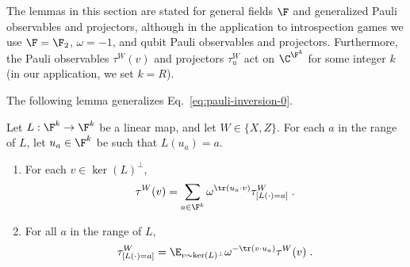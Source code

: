 The lemmas in this section are stated for general fields $\F$ and generalized
Pauli observables and projectors, although in the application to introspection
games we use $\F = \F_2$, $\omega = -1$, and qubit Pauli observables and
projectors.
Furthermore, the Pauli observables $\tau^W(v)$ and projectors $\tau^W_u$ act on
$\C^{\F^k}$ for some integer $k$ (in our application, we set $k=R$).



The following lemma generalizes Eq.~\eqref{eq:pauli-inversion-0}.

\begin{lemma}\label{lem:why-didnt-i-think-of-this-before}
Let $L: \F^k \to \F^k$ be a linear map, and let $W \in \{X, Z\}$.
For each $a$ in the range of $L$, let $u_a \in \F^k$ be such that $L(u_a) = a$. 
\begin{enumerate}
\item For each $v \in \ker(L)^\perp$, 
\begin{equation*}
\tau^W(v) = \sum_{a \in \F^k} \omega^{\tr(u_a \cdot v)} \tau^W_{[L(\cdot)=a]}\;.
\end{equation*}
\item For all $a$ in the range of $L$,
\begin{equation*}
\tau^W_{[L(\cdot)=a]} = \E_{v \sim \ker(L)^\perp} \omega^{-\tr(v \cdot u_a)} \tau^W(v)\;.
\end{equation*}
\end{enumerate}
\end{lemma}

